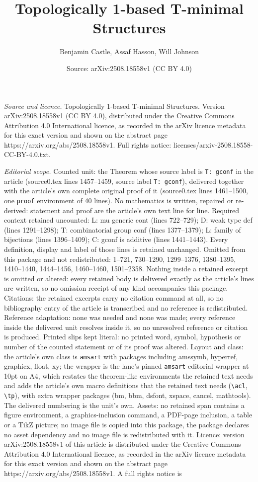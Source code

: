 \documentclass[10pt,a4paper]{amsart}
\title[Topologically 1-based T-minimal Structures]{Topologically 1-based T-minimal Structures}
\author{Benjamin Castle, Assaf Hasson, Will Johnson}
\date{Source: arXiv:2508.18558v1 (CC BY 4.0)}
\begin{document}
\maketitle

\noindent\emph{Source and licence.} Topologically 1-based T-minimal Structures. Version arXiv:2508.18558v1 (CC BY 4.0), distributed under the Creative Commons Attribution 4.0 International licence, as recorded in the arXiv licence metadata for this exact version and shown on the abstract page https://arxiv.org/abs/2508.18558v1. Full rights notice: licenses/arxiv-2508.18558-CC-BY-4.0.txt.\par\smallskip

\noindent\textit{Editorial scope.} Counted unit: the Theorem whose source label is \texttt{T: gconf} in the article (source0.tex lines 1457--1459, source label \texttt{T: gconf}), delivered together with the article's own complete original proof of it (source0.tex lines 1461--1500, one \texttt{proof} environment of 40 lines). No mathematics is written, repaired or re-derived: statement and proof are the article's own text line for line. Required context retained uncounted: L: mu generic cont (lines 722--729); D: weak type def (lines 1291--1298); T: combinatorial group conf (lines 1377--1379); L: family of bijections (lines 1396--1409); C: gconf is additive (lines 1441--1443). Every definition, display and label of those lines is retained unchanged. Omitted from this package and not redistributed: 1--721, 730--1290, 1299--1376, 1380--1395, 1410--1440, 1444--1456, 1460--1460, 1501--2358. Nothing inside a retained excerpt is omitted or altered: every retained body is delivered exactly as the article's lines are written, so no omission receipt of any kind accompanies this package. Citations: the retained excerpts carry no citation command at all, so no bibliography entry of the article is transcribed and no reference is redistributed. Reference adaptation: none was needed and none was made; every reference inside the delivered unit resolves inside it, so no unresolved reference or citation is produced. Printed slips kept literal: no printed word, symbol, hypothesis or number of the counted statement or of its proof was altered. Layout and class: the article's own class is \texttt{amsart} with packages including amssymb, hyperref, graphicx, float, xy; the wrapper is the lane's pinned \texttt{amsart} editorial wrapper at 10pt on A4, which restates the theorem-like environments the retained text needs and adds the article's own macro definitions that the retained text needs (\texttt{\textbackslash acl}, \texttt{\textbackslash tp}), with extra wrapper packages (bm, bbm, dsfont, xspace, cancel, mathtools). The delivered numbering is the unit's own. Assets: no retained span contains a figure environment, a graphics-inclusion command, a PDF-page inclusion, a table or a TikZ picture; no image file is copied into this package, the package declares no asset dependency and no image file is redistributed with it. Licence: version arXiv:2508.18558v1 of this article is distributed under the Creative Commons Attribution 4.0 International licence, as recorded in the arXiv licence metadata for this exact version and shown on the abstract page https://arxiv.org/abs/2508.18558v1. A full rights notice is 
\end{document}
